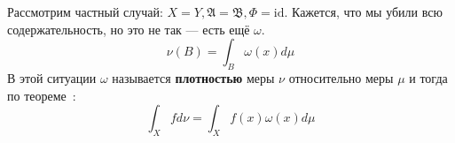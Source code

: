 \begin{definition}
    Рассмотрим частный случай: \(X = Y, \mathfrak{A} = \mathfrak{B}, \Phi = \text{id}\). Кажется, что мы убили всю содержательность, но это не так --- есть ещё \(\omega\).
    \[\nu(B) = \int_B \omega(x)d\mu\]
    В этой ситуации \(\omega\) называется \textbf{плотностью} меры \(\nu\) относительно меры \(\mu\) и тогда по теореме~:
    \[\int_X f d\nu = \int_X f(x) \omega(x) d\mu\]
\end{definition}

